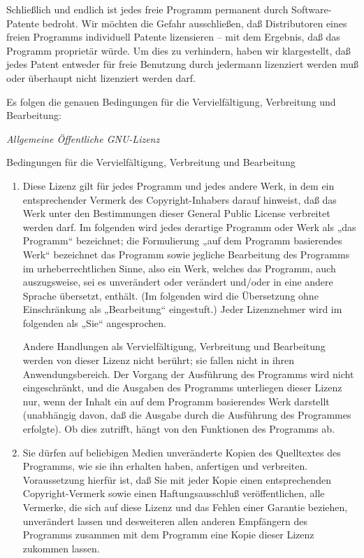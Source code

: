 {Schließlich und endlich ist jedes freie Programm permanent durch Software-Patente bedroht. Wir möchten die Gefahr ausschließen, daß Distributoren eines freien Programms individuell Patente lizensieren – mit dem Ergebnis, daß das Programm proprietär würde. Um dies zu verhindern, haben wir klargestellt, daß jedes Patent entweder für freie Benutzung durch jedermann lizenziert werden muß oder überhaupt nicht lizenziert werden darf.


Es folgen die genauen Bedingungen für die Vervielfältigung, Verbreitung und Bearbeitung:



{\it Allgemeine Öffentliche GNU-Lizenz}

Bedingungen für die Vervielfältigung, Verbreitung und Bearbeitung
\begin{enumerate}
  \item Diese Lizenz gilt für jedes Programm und jedes andere Werk, in dem ein entsprechender Vermerk des Copyright-Inhabers darauf hinweist, daß das Werk unter den Bestimmungen dieser General Public License verbreitet werden darf. Im folgenden wird jedes derartige Programm oder Werk als „das Programm“ bezeichnet; die Formulierung „auf dem Programm basierendes Werk“ bezeichnet das Programm sowie jegliche Bearbeitung des Programms im urheberrechtlichen Sinne, also ein Werk, welches das Programm, auch auszugsweise, sei es unverändert oder verändert und/oder in eine andere Sprache übersetzt, enthält. (Im folgenden wird die Übersetzung ohne Einschränkung als „Bearbeitung“ eingestuft.) Jeder Lizenznehmer wird im folgenden als „Sie“ angesprochen.

Andere Handlungen als Vervielfältigung, Verbreitung und Bearbeitung werden von dieser Lizenz nicht berührt; sie fallen nicht in ihren Anwendungsbereich. Der Vorgang der Ausführung des Programms wird nicht eingeschränkt, und die Ausgaben des Programms unterliegen dieser Lizenz nur, wenn der Inhalt ein auf dem Programm basierendes Werk darstellt (unabhängig davon, daß die Ausgabe durch die Ausführung des Programmes erfolgte). Ob dies zutrifft, hängt von den Funktionen des Programms ab.

\item Sie dürfen auf beliebigen Medien unveränderte Kopien des Quelltextes des Programms, wie sie ihn erhalten haben, anfertigen und verbreiten. Voraussetzung hierfür ist, daß Sie mit jeder Kopie einen entsprechenden Copyright-Vermerk sowie einen Haftungsausschluß veröffentlichen, alle Vermerke, die sich auf diese Lizenz und das Fehlen einer Garantie beziehen, unverändert lassen und desweiteren allen anderen Empfängern des Programms zusammen mit dem Programm eine Kopie dieser Lizenz zukommen lassen.


\end{enumerate}}

